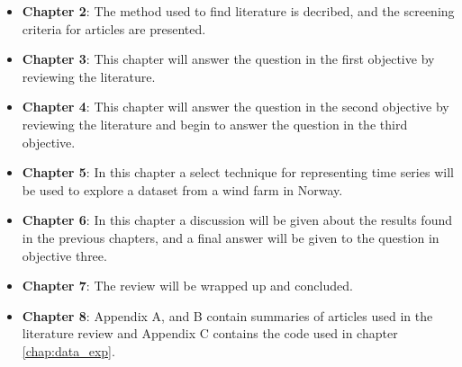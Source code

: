 \begin{itemize}
    \item \textbf{Chapter 2}: The method used to find literature is decribed, and the screening criteria for articles are presented.
    \item \textbf{Chapter 3}: This chapter will answer the question in the first objective by reviewing the literature.
    \item \textbf{Chapter 4}: This chapter will answer the question in the second objective by reviewing the literature and begin to answer the question in the third objective.
    \item \textbf{Chapter 5}: In this chapter a select technique for representing time series will be used to explore a dataset from a wind farm in Norway.
    \item \textbf{Chapter 6}: In this chapter a discussion will be given about the results found in the previous chapters, and a final answer will be given to the question in objective three.
    \item \textbf{Chapter 7}: The review will be wrapped up and concluded.
    \item \textbf{Chapter 8}: Appendix A, and B contain summaries of articles used in the literature review and Appendix C contains the code used in chapter \ref{chap:data_exp}.
\end{itemize}
